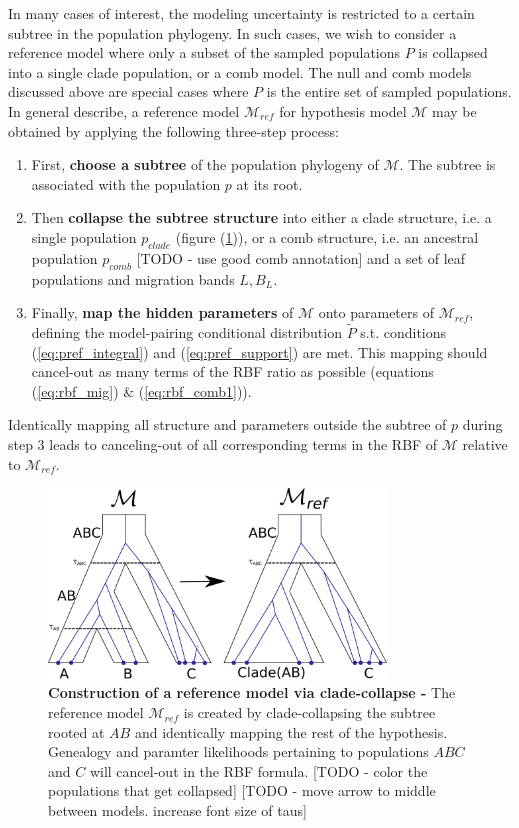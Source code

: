 \documentclass[11pt]{article}
\newcommand{\M}{\mathcal{M}}
\newcommand{\Mref}{\M_{ref}}
\newcommand{\Pref}{\widetilde{P}}
\newcommand{\1}{\mathbbm{1}}
\begin{document}
In many cases of interest, the modeling uncertainty is restricted to a certain subtree in the population phylogeny.
%
In such cases, we wish to consider a reference model where only a subset of the sampled populations $P$ is collapsed into a single clade population, or a comb model. The null and comb models discussed above are special cases where
$P$ is the entire set of sampled populations.\\
%
In general describe, a reference model $\Mref$ for hypothesis model $\M$ may be obtained by applying the following three-step process:

\begin{enumerate}
\item First, \textbf{choose a subtree} of the population phylogeny of $\M$. The subtree is associated with the population $p$ at its root. 

\item Then \textbf{collapse the subtree structure} into either a clade structure, i.e. a single population $p_{clade}$ (figure (\ref{fig:clade_collapse_AB})), or a comb structure, i.e. an ancestral population $p_{comb}$ [TODO - use good comb annotation] and a set of leaf populations and migration bands $L, B_L$. 

\item Finally, \textbf{map the hidden parameters} of $\M$ onto parameters of $\Mref$, defining the model-pairing conditional distribution $\Pref$ s.t. conditions (\ref{eq:pref_integral}) and (\ref{eq:pref_support}) are met. This mapping should cancel-out as many terms of the RBF ratio as possible (equations (\ref{eq:rbf_mig}) \& (\ref{eq:rbf_comb1})).
\end{enumerate}

Identically mapping all structure and parameters outside the subtree of $p$ during step 3 leads to canceling-out of all corresponding terms in the RBF of $\M$ relative to $\Mref$.

%
\begin{figure}[h]
\centering
\includegraphics[width=0.8\textwidth]
{clade_collapse_AB}

\captionsetup{width=.8\textwidth}
\caption{\textbf{Construction of a reference model via clade-collapse - } The reference model  $\Mref$ is created by clade-collapsing  the subtree rooted at $AB$ and identically mapping the rest of the hypothesis. Genealogy and paramter likelihoods pertaining to populations $ABC$ and $C$ will cancel-out in the RBF formula. [TODO - color the populations that get collapsed] [TODO - move arrow to middle between models. increase font size of taus]}
\label{fig:clade_collapse_AB}
\end{figure}
\end{document}
